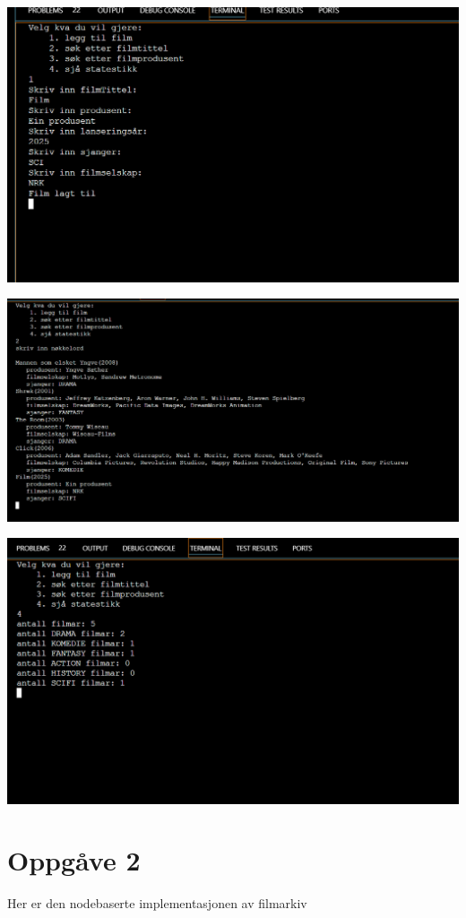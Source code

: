 \documentclass{article}
\begin{document}
\includegraphics[scale=0.5]{Skjermbilde 2025-01-31 180522.png}

\includegraphics[scale=0.5]{Skjermbilde 2025-01-31 180742.png}

\includegraphics[scale=0.5]{Skjermbilde 2025-01-31 180753.png}


\section{Oppgåve 2}
Her er den nodebaserte implementasjonen av filmarkiv

\end{document}
